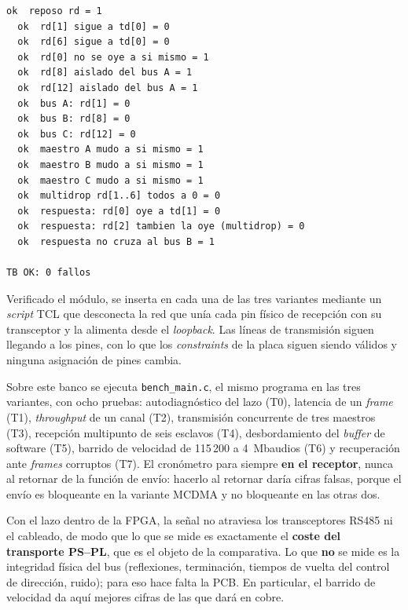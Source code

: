 \begin{lstlisting}[style=terminal, caption={Salida de la simulación de \texttt{tb\_bench\_loopback.v}}]
  ok  reposo rd = 1
  ok  rd[1] sigue a td[0] = 0
  ok  rd[6] sigue a td[0] = 0
  ok  rd[0] no se oye a si mismo = 1
  ok  rd[8] aislado del bus A = 1
  ok  rd[12] aislado del bus A = 1
  ok  bus A: rd[1] = 0
  ok  bus B: rd[8] = 0
  ok  bus C: rd[12] = 0
  ok  maestro A mudo a si mismo = 1
  ok  maestro B mudo a si mismo = 1
  ok  maestro C mudo a si mismo = 1
  ok  multidrop rd[1..6] todos a 0 = 0
  ok  respuesta: rd[0] oye a td[1] = 0
  ok  respuesta: rd[2] tambien la oye (multidrop) = 0
  ok  respuesta no cruza al bus B = 1

TB OK: 0 fallos
\end{lstlisting}

Verificado el módulo, se inserta en
cada una de las tres variantes mediante un \textit{script} TCL que desconecta la red que unía cada
pin físico de recepción con su transceptor y la alimenta desde el \textit{loopback}. Las líneas de
transmisión siguen llegando a los pines, con lo que los \textit{constraints} de la placa siguen
siendo válidos y ninguna asignación de pines cambia.

Sobre este banco se ejecuta \texttt{bench\_main.c}, el mismo programa en las tres variantes, con
ocho pruebas: autodiagnóstico del lazo (T0), latencia de un \textit{frame} (T1), \textit{throughput} de un
canal (T2), transmisión concurrente de tres maestros (T3), recepción multipunto de seis esclavos
(T4), desbordamiento del \textit{buffer} de software (T5), barrido de velocidad de 115\,200 a
4~Mbaudios (T6) y recuperación ante \textit{frames} corruptos (T7). El cronómetro para siempre
\textbf{en el receptor}, nunca al retornar de la función de envío: hacerlo al retornar daría cifras
falsas, porque el envío es bloqueante en la variante MCDMA y no bloqueante en las otras dos.

Con el lazo dentro de la FPGA, la señal no atraviesa los transceptores RS485 ni el cableado, de
modo que lo que se mide es exactamente el \textbf{coste del transporte PS--PL}, que es el objeto
de la comparativa. Lo que \textbf{no} se
mide es la integridad física del bus (reflexiones, terminación, tiempos de vuelta del control
de dirección, ruido); para eso hace falta la PCB. En particular, el barrido de velocidad da
aquí mejores cifras de las que dará en cobre.
